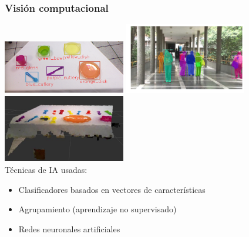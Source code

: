 \documentclass[10pt,spanish,aspectratio=1610]{beamer}
\begin{document}
\begin{frame}\frametitle{Visión computacional}
  \centering
  \includegraphics[width=0.4\textwidth]{Figures/Vision1.png}
  \includegraphics[width=0.4\textwidth]{Figures/Vision2.png}\\
  \includegraphics[width=0.4\textwidth]{Figures/Vision3.jpg}\\
  Técnicas de IA usadas:
  \begin{itemize}
  \item Clasificadores basados en vectores de características
  \item Agrupamiento (aprendizaje no supervisado)
  \item Redes neuronales artificiales
  \end{itemize}
\end{frame}
\end{document}
